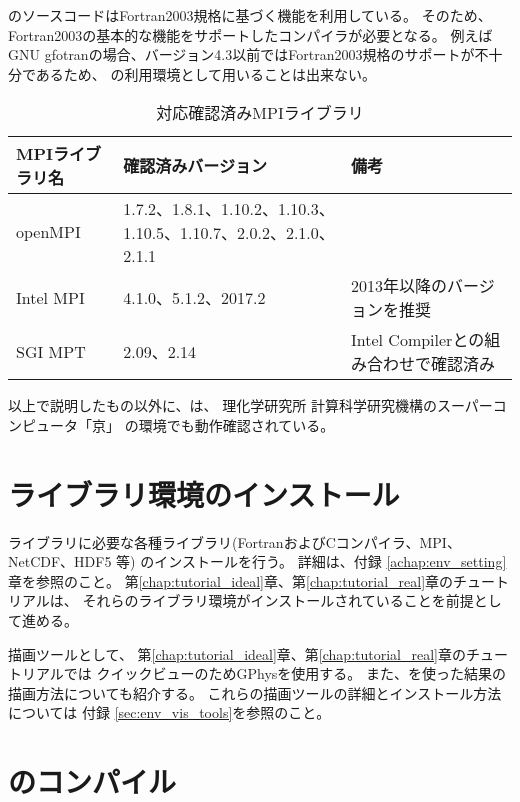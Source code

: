 \scalelib のソースコードはFortran2003規格に基づく機能を利用している。
そのため、Fortran2003の基本的な機能をサポートしたコンパイラが必要となる。
例えばGNU gfotranの場合、バージョン4.3以前ではFortran2003規格のサポートが不十分であるため、
\scalelib の利用環境として用いることは出来ない。

\begin{table}[htb]
\begin{center}
\caption{対応確認済みMPIライブラリ}
\begin{tabularx}{150mm}{|l|X|X|} \hline
 \rowcolor[gray]{0.9} MPIライブラリ名 & 確認済みバージョン & 備考 \\ \hline
 openMPI   & 1.7.2、1.8.1、1.10.2、1.10.3、1.10.5、1.10.7、2.0.2、2.1.0、2.1.1 & \\ \hline
 Intel MPI & 4.1.0、5.1.2、2017.2 & 2013年以降のバージョンを推奨 \\ \hline
 SGI MPT   & 2.09、2.14               & Intel Compilerとの組み合わせで確認済み \\ \hline
\end{tabularx}
\label{tab:compatible_mpi}
\end{center}
\end{table}

以上で説明したもの以外に、\scalelib は、
理化学研究所 計算科学研究機構のスーパーコンピュータ「京」
の環境でも動作確認されている。


\section{ライブラリ環境のインストール} \label{sec:inst_env}
\scalelib ライブラリに必要な各種ライブラリ(FortranおよびCコンパイラ、MPI、NetCDF、HDF5 等)
のインストールを行う。
詳細は、付録 \ref{achap:env_setting}章を参照のこと。
第\ref{chap:tutorial_ideal}章、第\ref{chap:tutorial_real}章のチュートリアルは、
それらのライブラリ環境がインストールされていることを前提として進める。

描画ツールとして、
第\ref{chap:tutorial_ideal}章、第\ref{chap:tutorial_real}章のチュートリアルでは
クイックビューのためGPhysを使用する。
また、\grads を使った結果の描画方法についても紹介する。
これらの描画ツールの詳細とインストール方法については
付録 \ref{sec:env_vis_tools}を参照のこと。



\section{\scalelib のコンパイル} \label{sec:scale_compile}

